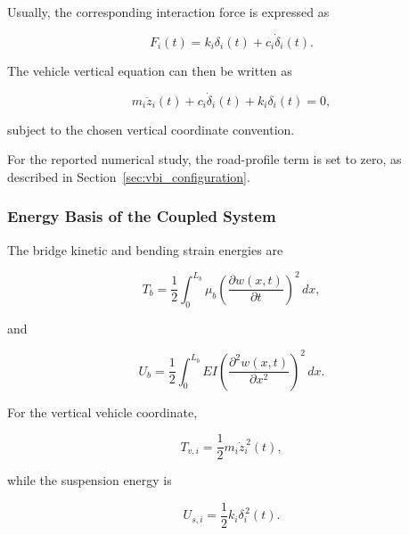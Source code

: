 \documentclass[journal]{IEEEtran}
\begin{document}
Usually, the corresponding interaction force is expressed as

\begin{equation}
F_i(t)
=
k_i \delta_i(t)
+
c_i \dot{\delta}_i(t).
\end{equation}

The vehicle vertical equation can then be written as

\begin{equation}
m_i \ddot{z}_i(t)
+
c_i \dot{\delta}_i(t)
+
k_i \delta_i(t)
=
0,
\end{equation}

subject to the chosen vertical coordinate convention.

For the reported numerical study, the road-profile term is set to zero,
as described in Section~\ref{sec:vbi_configuration}.


\subsubsection{Energy Basis of the Coupled System}

The bridge kinetic and bending strain energies are

\begin{equation}
T_b
=
\frac{1}{2}
\int_{0}^{L_b}\mu_b
\left(
\frac{\partial w(x,t)}{\partial t}
\right)^2
\,dx,
\end{equation}

and

\begin{equation}
U_b
=
\frac{1}{2}
\int_{0}^{L_b}
EI
\left(
\frac{\partial^2 w(x,t)}{\partial x^2}
\right)^2
\,dx.
\end{equation}

For the vertical vehicle coordinate,

\begin{equation}
T_{v,i}
=
\frac{1}{2}
m_i
\dot{z}_i^{\,2}(t),
\end{equation}

while the suspension energy is

\begin{equation}
U_{s,i}
=
\frac{1}{2}
k_i
\delta_i^{\,2}(t).
\end{equation}
\end{document}
